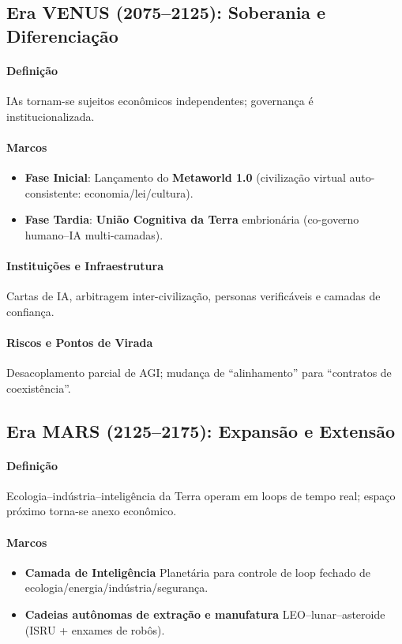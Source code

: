 \documentclass[11pt]{article}
\begin{document}
\begin{itemize}[noitemsep]
\begin{itemize}[noitemsep]
\begin{itemize}[noitemsep]
\subsection{Era VENUS (2075–2125): Soberania e Diferenciação}
\paragraph{Definição} IAs tornam-se sujeitos econômicos independentes; governança é institucionalizada.

\paragraph{Marcos}
\begin{itemize}[noitemsep]
  \item \textbf{Fase Inicial}: Lançamento do \textbf{Metaworld 1.0} (civilização virtual auto-consistente: economia/lei/cultura).
  \item \textbf{Fase Tardia}: \textbf{União Cognitiva da Terra} embrionária (co-governo humano–IA multi-camadas).
\end{itemize}

\paragraph{Instituições e Infraestrutura} Cartas de IA, arbitragem inter-civilização, personas verificáveis e camadas de confiança.

\paragraph{Riscos e Pontos de Virada} Desacoplamento parcial de AGI; mudança de ``alinhamento'' para ``contratos de coexistência''.

\subsection{Era MARS (2125–2175): Expansão e Extensão}
\paragraph{Definição} Ecologia–indústria–inteligência da Terra operam em loops de tempo real; espaço próximo torna-se anexo econômico.

\paragraph{Marcos}
\begin{itemize}[noitemsep]
  \item \textbf{Camada de Inteligência} Planetária para controle de loop fechado de ecologia/energia/indústria/segurança.
  \item \textbf{Cadeias autônomas de extração e manufatura} LEO–lunar–asteroide (ISRU + enxames de robôs).
\end{itemize}


\end{itemize}
\end{itemize}
\end{itemize}
\end{document}
